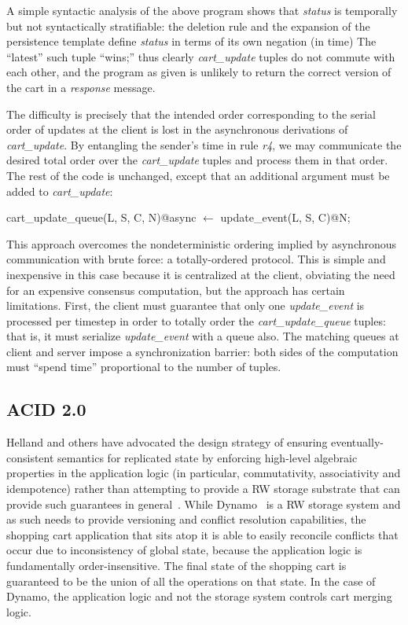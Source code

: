 A simple syntactic analysis of the above program shows that {\em status} 
is temporally but not syntactically stratifiable: the deletion rule and the expansion of the
persistence template define {\em status} in terms of its own negation (in time) 
The ``latest''
such tuple ``wins;'' thus clearly {\em cart\_update} tuples do not commute with each other,
and the program as given is unlikely to return the correct version of the cart in a {\em response}
message.

The difficulty is precisely that the intended order corresponding to the serial order of updates
at the client is lost in the asynchronous derivations of {\em cart\_update}.  By entangling
the sender's time in rule  {\em r4}, we may communicate the desired total order over 
the {\em cart\_update} tuples and process them in that order.  The rest of the code is unchanged,
except that an additional argument must be added to {\em cart\_update}:

\begin{Dedalus}
cart_update_queue(L, S, C, N)@async \(\leftarrow\)
    update_event(L, S, C)@N;
\end{Dedalus}

This approach overcomes the nondeterministic ordering implied by asynchronous 
communication with brute force: a totally-ordered protocol.  This is simple and inexpensive 
in this case because it is centralized at the client, obviating the need for an expensive consensus computation, but the approach has certain limitations.  First, the client
must guarantee that only one {\em update\_event} is processed per timestep in order to totally
order the {\em cart\_update\_queue} tuples: that is, it must serialize {\em update\_event} with
a queue also.  The matching queues at client and server impose a synchronization barrier: both sides of the computation must ``spend time'' proportional to the number of tuples.

\subsection{ACID 2.0}

Helland and others have advocated the design strategy of ensuring eventually-consistent 
semantics for replicated state by enforcing high-level algebraic 
properties in the application logic (in particular, commutativity, associativity and 
idempotence) rather than attempting to provide a RW storage substrate that can provide
such guarantees in general~\cite{quicksand, beyond}.  While Dynamo~\cite{dynamo} 
is a RW storage system
and as such needs to provide versioning and conflict resolution capabilities, the shopping
cart application that sits atop it is able to easily reconcile conflicts that occur due to inconsistency of global state, because the application logic is fundamentally order-insensitive.
The final state of the shopping cart is guaranteed to be the union of all the operations on
that state.  In the case of Dynamo, the application logic and not the storage system controls
cart merging logic.

